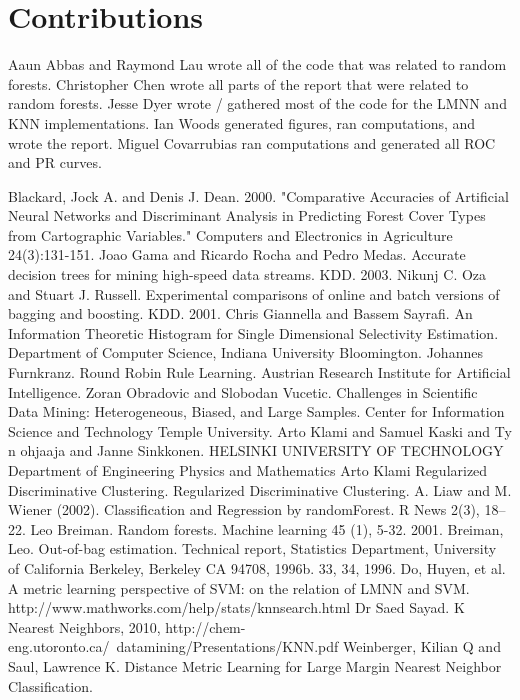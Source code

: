 \documentclass[11pt]{article}
\begin{document}
    \section{Contributions}
    Aaun Abbas and Raymond Lau wrote all of the code that was related to random forests. Christopher Chen wrote all parts of the report that were related to random forests. Jesse Dyer wrote / gathered most of the code for the LMNN and KNN implementations. Ian Woods generated figures, ran computations, and wrote the report. Miguel Covarrubias ran computations and generated all ROC and PR curves.
    \pagebreak
    \begin{thebibliography}{}
    Blackard, Jock A. and Denis J. Dean. 2000. "Comparative Accuracies of Artificial Neural Networks and Discriminant Analysis in Predicting Forest Cover Types from Cartographic Variables." Computers and Electronics in Agriculture 24(3):131-151.
    Joao Gama and Ricardo Rocha and Pedro Medas. Accurate decision trees for mining high-speed data streams. KDD. 2003.
    Nikunj C. Oza and Stuart J. Russell. Experimental comparisons of online and batch versions of bagging and boosting. KDD. 2001.
    Chris Giannella and Bassem Sayrafi. An Information Theoretic Histogram for Single Dimensional Selectivity Estimation. Department of Computer Science, Indiana University Bloomington.
    Johannes Furnkranz. Round Robin Rule Learning. Austrian Research Institute for Artificial Intelligence.
    Zoran Obradovic and Slobodan Vucetic. Challenges in Scientific Data Mining: Heterogeneous, Biased, and Large Samples. Center for Information Science and Technology Temple University.
    Arto Klami and Samuel Kaski and Ty n ohjaaja and Janne Sinkkonen. HELSINKI UNIVERSITY OF TECHNOLOGY Department of Engineering Physics and Mathematics Arto Klami Regularized Discriminative Clustering. Regularized Discriminative Clustering.
    A. Liaw and M. Wiener (2002). Classification and Regression by randomForest. R News 2(3), 18--22.
    Leo Breiman. Random forests. Machine learning 45 (1), 5-32. 2001.
    Breiman, Leo. Out-of-bag estimation. Technical report, Statistics Department, University of California Berkeley, Berkeley CA 94708, 1996b. 33, 34, 1996.
    Do, Huyen, et al. A metric learning perspective of SVM: on the relation of LMNN and SVM.
    http://www.mathworks.com/help/stats/knnsearch.html
    Dr Saed Sayad. K Nearest Neighbors, 2010, http://chem-eng.utoronto.ca/~datamining/Presentations/KNN.pdf
    Weinberger, Kilian Q and Saul, Lawrence K. Distance Metric Learning for Large Margin
Nearest Neighbor Classification.
    \end{thebibliography}
    
\end{document}
